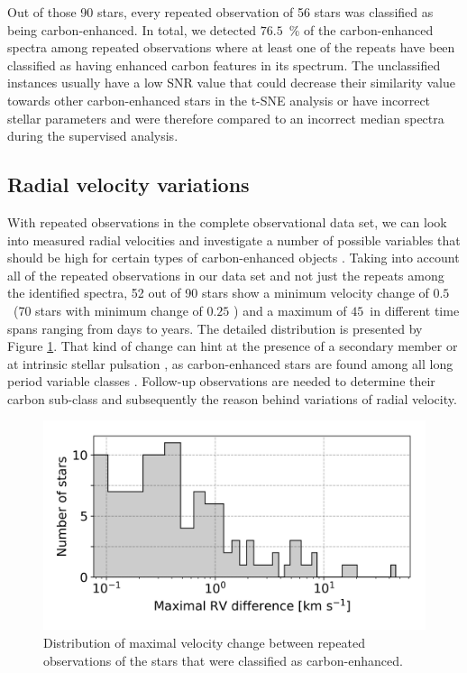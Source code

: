 Out of those 90 stars, every repeated observation of 56 stars was classified as being carbon-enhanced. In total, we detected $76.5$~\% of the carbon-enhanced spectra among repeated observations where at least one of the repeats have been classified as having enhanced carbon features in its spectrum. The unclassified instances usually have a low SNR value that could decrease their similarity value towards other carbon-enhanced stars in the t-SNE analysis or have incorrect stellar parameters and were therefore compared to an incorrect median spectra during the supervised analysis.

\subsection{Radial velocity variations}
\label{sec:binaries}
With repeated observations in the complete observational data set, we can look into measured radial velocities and investigate a number of possible variables that should be high for certain types of carbon-enhanced objects \citep{2016ApJ...826...85S}. Taking into account all of the repeated observations in our data set and not just the repeats among the identified spectra, 52 out of 90 stars show a minimum velocity change of $0.5$~\kms (70 stars with minimum change of $0.25$ \kms) and a maximum of $45$~\kms in different time spans ranging from days to years. The detailed distribution is presented by Figure \ref{fig:rv_rep_dist}. That kind of change can hint at the presence of a secondary member or at intrinsic stellar pulsation \citep{2002AA...390..987B, 2010JApA...31..177L, 2012A&A...544A..10B}, as carbon-enhanced stars are found among all long period variable classes \citep[Mira, SRa, and SRb, ][]{2013A&A...553A..93B, 2014A&A...568A.100B}. Follow-up observations are needed to determine their carbon sub-class and subsequently the reason behind variations of radial velocity.

\begin{figure}
	\centering
	\includegraphics[width=\columnwidth]{rv_rep_dist.png}
	\caption{Distribution of maximal velocity change between repeated observations of the stars that were classified as carbon-enhanced.}
	\label{fig:rv_rep_dist}
\end{figure}

